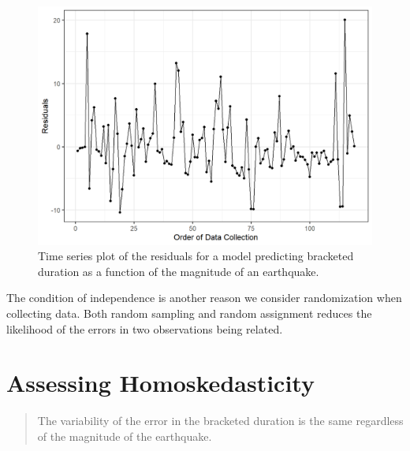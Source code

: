 \documentclass[
]{book}
\theoremstyle{plain}
\theoremstyle{mydefn}
\theoremstyle{myexmpl}
\theoremstyle{remark}
\begin{document}
\begin{figure}

{\centering \includegraphics[width=0.8\linewidth]{./Images/regassessment-independence-1} 

}

\caption{Time series plot of the residuals for a model predicting bracketed duration as a function of the magnitude of an earthquake.}\label{fig:regassessment-independence}
\end{figure}

The condition of independence is another reason we consider randomization when collecting data. Both random sampling and random assignment reduces the likelihood of the errors in two observations being related.

\hypertarget{assessing-homoskedasticity}{%
\section{Assessing Homoskedasticity}\label{assessing-homoskedasticity}}

\begin{quote}
The variability of the error in the bracketed duration is the same regardless of the magnitude of the earthquake.
\end{quote}
\end{document}

